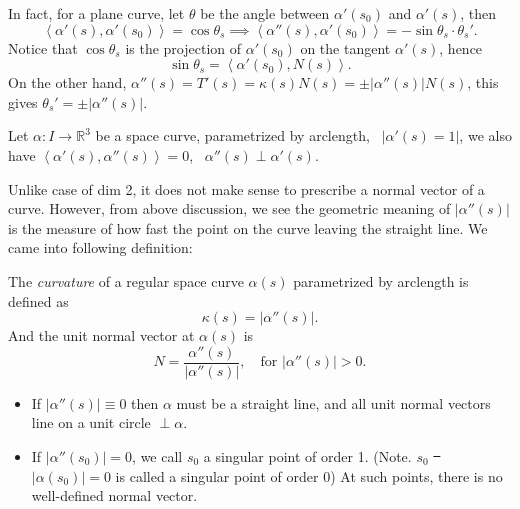 In fact, for a plane curve, let \(\theta\) be the angle between \(\alpha'(s_0)\) and
\(\alpha'(s)\), then \[
    \left<\alpha'(s),\alpha'(s_0)\right> =\cos\theta_s\implies 
    \left<\alpha''(s),\alpha'(s_0)\right> =-\sin\theta_s\cdot \theta_s'
.\] Notice that \(\cos\theta_s\) is the projection of \(\alpha'(s_0)\) on the tangent
\(\alpha'(s)\), hence \[
    \sin\theta_s=\left<\alpha'(s_0),N(s)\right> 
.\] On the other hand, \(\alpha''(s)=T'(s)=\kappa(s)N(s)=\pm|\alpha''(s)|N(s)\),
this gives \(\theta_s'=\pm|\alpha''(s)|\).


Let \(\alpha\colon I\to \mathbb{R}^3\) be a space curve, parametrized by arclength,
\ie\ \(|\alpha'(s)=1|\), we also have \(\left<\alpha'(s),\alpha''(s)\right> =0\),
\ie\ \(\alpha''(s)\perp\alpha'(s)\).

Unlike case of dim 2, it does not make sense to prescribe a normal vector of
a curve. However, from above discussion, we see the geometric meaning of
\(|\alpha''(s)|\) is the measure of how fast the point on the curve leaving the
straight line. We came into following definition:
\begin{definition}
    The \emph{curvature} of a regular space curve \(\alpha(s)\) parametrized by
    arclength is defined as \[
        \kappa(s)=|\alpha''(s)|
    .\] And the unit normal vector at \(\alpha(s)\) is \[
        N=\frac{\alpha''(s)}{|\alpha''(s)|},\quad\text{for }|\alpha''(s)|>0
    .\] 
\end{definition}
\begin{remark}\hfill
\begin{itemize}
    \item If \(|\alpha''(s)|\equiv 0\) then \(\alpha\) must be a straight line,
        and all unit normal vectors line on a unit circle \(\perp\alpha\).
    \item If \(|\alpha''(s_0)|=0\), we call \(s_0\) a singular point of order 1.
        (Note. \(s_0\) \st\ \(|\alpha(s_0)|=0\) is called a singular point 
        of order 0) At such points, there is no well-defined normal vector.
    \end{itemize}
\end{remark}

